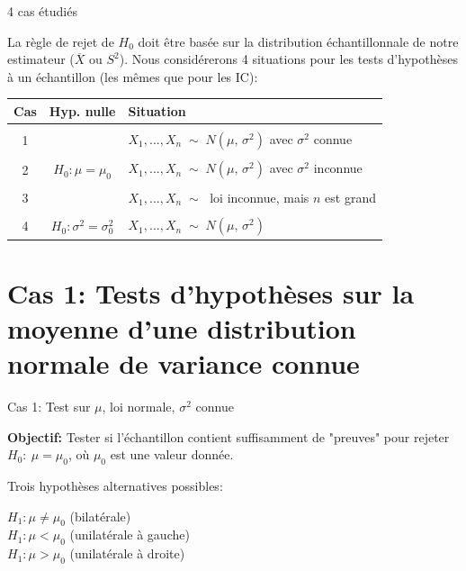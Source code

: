 \documentclass{BeamerTemplate}
\begin{document}
\begin{frame}{4 cas étudiés}

La règle de rejet de $H_0$  doit être basée sur la distribution échantillonnale de notre estimateur ($\overline X$ ou $S^2$). Nous considérerons 4 situations pour les tests d'hypothèses à un échantillon (les mêmes que pour les IC):
\vspace{0.3cm}
\small

\begin{tabular}{|c|c|l|}
  \hline
  Cas&Hyp. nulle  & Situation \\\hline
&&\\[-0.3cm]
1&   & $X_1, ..., X_n\;\sim\;N(\mu, \, \sigma^2)$ avec $\sigma^2$ connue \\
&&\\
2& $H_0:\mu=\mu_0$ & $X_1, ..., X_n\;\sim\;N(\mu, \, \sigma^2)$ avec $\sigma^2$ inconnue  \\
&&\\
3&   & $X_1, ..., X_n\;\sim\;$ loi inconnue, mais $n$ est grand  \\[0.2cm]\hline
&&\\[-0.3cm]
4& $H_0:\sigma^2=\sigma^2_0$& $X_1, ..., X_n\;\sim\;N(\mu, \, \sigma^2)$ \\[0.2cm]\hline
\end{tabular}
\normalsize
\vspace{0.7cm}

\end{frame}

\section[1)Test sur $\mu$ ($\sigma^2$ connue)]{Cas 1: Tests d'hypothèses sur la moyenne d'une distribution normale de variance connue}

\begin{frame}[t]{Cas 1: Test sur $\mu$, loi normale, $\sigma^2$  connue}

{\color{blue}{Supposons un échantillon aléatoire  $X_1,\ldots,X_n$ issu d'une population $N(\mu, \sigma^2)$ o\`u $\mu$ est inconnue mais $\sigma^2$ est connue.}}

\bigskip
{\bf Objectif:}
Tester si l'échantillon contient suffisamment de "preuves" pour rejeter $H_0:~\mu=\mu_0$, o\`u $\mu_0$ est une valeur donnée.

\bigskip
Trois hypothèses alternatives possibles:

$H_1 : \mu \ne \mu_0$ (bilatérale) \\
$H_1 : \mu < \mu_0$ (unilatérale à gauche) \\
$H_1 : \mu > \mu_0$ (unilatérale à droite) \\
\end{frame}
\end{document}
